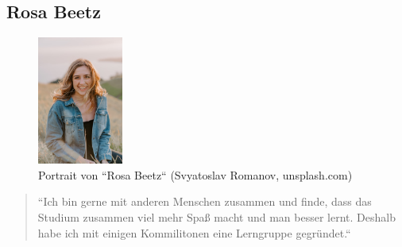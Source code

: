 \documentclass{article}
\begin{document}
\newpage

\subsection{Rosa Beetz}

\begin{figure}[h]
	\includegraphics[width=0.25\textwidth]{rosa}
	\centering
	\caption{Portrait von ``Rosa Beetz`` (Svyatoslav Romanov, unsplash.com)}
\end{figure}

\begin{quote}
	\large{``Ich bin gerne mit anderen Menschen zusammen und finde, dass das Studium
		zusammen viel mehr Spaß macht und man besser lernt. Deshalb habe ich mit einigen
		Kommilitonen eine Lerngruppe gegründet.``}
\end{quote}
\end{document}
